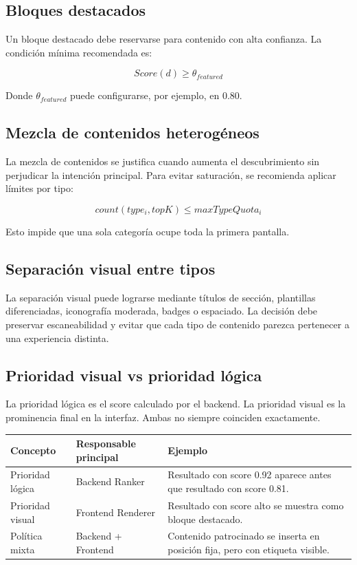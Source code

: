 \documentclass[12pt,a4paper]{article}
\begin{document}
\subsection{Bloques destacados}

Un bloque destacado debe reservarse para contenido con alta confianza. La condición mínima recomendada es:

\[
Score(d) \geq \theta_{featured}
\]

Donde $\theta_{featured}$ puede configurarse, por ejemplo, en $0.80$.

\subsection{Mezcla de contenidos heterogéneos}

La mezcla de contenidos se justifica cuando aumenta el descubrimiento sin perjudicar la intención principal. Para evitar saturación, se recomienda aplicar límites por tipo:

\[
count(type_i, topK) \leq maxTypeQuota_i
\]

Esto impide que una sola categoría ocupe toda la primera pantalla.

\subsection{Separación visual entre tipos}

La separación visual puede lograrse mediante títulos de sección, plantillas diferenciadas, iconografía moderada, badges o espaciado. La decisión debe preservar escaneabilidad y evitar que cada tipo de contenido parezca pertenecer a una experiencia distinta.

\subsection{Prioridad visual vs prioridad lógica}

La prioridad lógica es el score calculado por el backend. La prioridad visual es la prominencia final en la interfaz. Ambas no siempre coinciden exactamente.

\begin{longtable}{p{4cm}p{5cm}p{5cm}}
\toprule
\textbf{Concepto} & \textbf{Responsable principal} & \textbf{Ejemplo} \\
\midrule
\endhead

Prioridad lógica & Backend Ranker & Resultado con score 0.92 aparece antes que resultado con score 0.81. \\

Prioridad visual & Frontend Renderer & Resultado con score alto se muestra como bloque destacado. \\

Política mixta & Backend + Frontend & Contenido patrocinado se inserta en posición fija, pero con etiqueta visible. \\

\bottomrule
\end{longtable}
\end{document}
